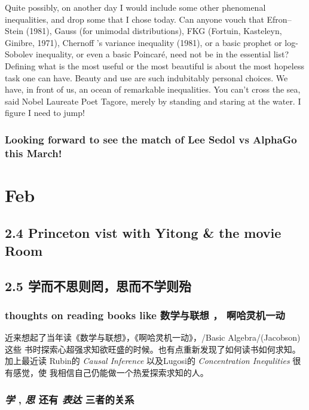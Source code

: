 \documentclass[11pt]{article}
\begin{document}
Quite possibly, on another day I would include some other phenomenal
inequalities, and drop some that I chose today. Can anyone vouch that
Efron–Stein (1981), Gauss (for unimodal distributions), FKG (Fortuin, Kasteleyn,
Ginibre, 1971), Chernoff ’s variance inequality (1981), or a basic prophet or
log-Sobolev inequality, or even a basic Poincaré, need not be in the essential
list? Defining what is the most useful or the most beautiful is about the most
hopeless task one can have. Beauty and use are such indubitably personal
choices. We have, in front of us, an ocean of remarkable inequalities. You can’t
cross the sea, said Nobel Laureate Poet Tagore, merely by standing and staring
at the water. I figure I need to jump!

\subsubsection*{Looking forward to see the match of Lee Sedol vs AlphaGo this March!}
\label{sec:orgheadline67}

\section*{Feb}
\label{sec:orgheadline124}

\subsection*{2.4 Princeton vist with Yitong \& the movie \textbf{Room}}
\label{sec:orgheadline70}

\subsection*{2.5 \textbf{学而不思则罔，思而不学则殆}}
\label{sec:orgheadline76}

\subsubsection*{thoughts on reading books like \textbf{数学与联想} ， \textbf{啊哈灵机一动}}
\label{sec:orgheadline71}
近来想起了当年读《数学与联想》，《啊哈灵机一动》，/Basic Algebra/(Jacobson)这些
书时探索心超强求知欲旺盛的时候。也有点重新发现了如何读书如何求知。加上最近读
Rubin的 \emph{Causal Inference} 以及Lugosi的 \emph{Concentration Inequlities} 很有感觉，使
我相信自己仍能做一个热爱探索求知的人。

\subsubsection*{\emph{学} , \emph{思} 还有 \emph{表达} 三者的关系}
\label{sec:orgheadline72}
\end{document}
